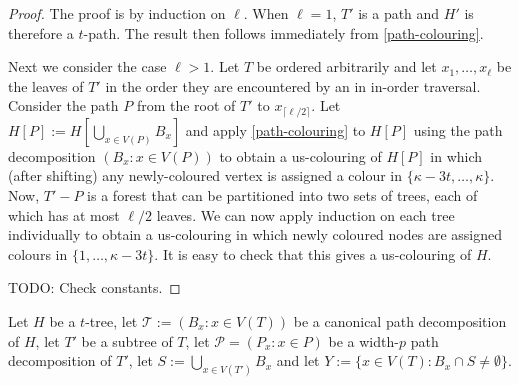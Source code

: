 \documentclass[kpfonts]{patmorin}
\begin{document}
\begin{proof}
    The proof is by induction on $\ell$.  When $\ell=1$, $T'$ is a path and $H'$ is therefore a $t$-path.  The result then follows immediately from \cref{path-colouring}.

    Next we consider the case $\ell >1$.
    Let $T$ be ordered arbitrarily and let $x_1,\ldots,x_\ell$ be the leaves of $T'$ in the order they are encountered by an in in-order traversal.  Consider the path $P$ from the root of $T'$ to $x_{\lceil \ell/2\rceil}$.   Let $H[P]:=H[\bigcup_{x\in V(P)} B_x]$ and apply \cref{path-colouring} to $H[P]$ using the path decomposition $(B_x:x\in V(P))$ to obtain a us-colouring of $H[P]$ in which (after shifting) any newly-coloured vertex is assigned a colour in $\{\kappa - 3t,\ldots,\kappa\}$. Now, $T'-P$ is a forest that can be partitioned into two sets of trees, each of which has at most $\ell/2$ leaves.  We can now apply induction on each tree individually to obtain a us-colouring in which newly coloured nodes are assigned colours in $\{1,\ldots,\kappa-3t\}$.  It is easy to check that this gives a us-colouring of $H$.

    TODO: Check constants.
\end{proof}

\begin{lem}
    Let $H$ be a $t$-tree, let $\mathcal{T}:=(B_x:x\in V(T))$ be a canonical path decomposition of $H$,  let $T'$ be a subtree of $T$, let $\mathcal{P}=(P_x:x\in P)$ be a width-$p$ path decomposition of $T'$, let $S:=\bigcup_{x\in V(T')} B_x$  and let $Y:=\{x\in V(T): B_x\cap S\neq\emptyset\}$.
\end{lem}





\end{document}
